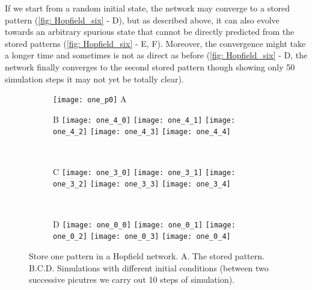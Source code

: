 If we start from a random initial state, the network may converge to
a stored pattern (\autoref{fig: Hopfield_six} - \textsf{D}), but as
described above, it can also evolve towards an arbitrary spurious state
that cannot be directly predicted from the stored patterns
(\autoref{fig: Hopfield_six} - \textsf{E, F}). Moreover, the convergence
might take a longer time and sometimes is not as direct as before 
(\autoref{fig: Hopfield_six} - \textsf{D}, the network finally converges
to the second stored pattern though showing only 50 simulation steps it may 
not yet be totally clear).

\newpage
\null
\vfill
\begin{figure}[H]
  \centering
  \begin{subfigure}{0.28\textwidth}
    \centering
    \texttt{[image: one\_p0]}
    \textsf{A}
  \end{subfigure}
  \hspace{0.7em}
  \begin{minipage}{0.62\textwidth}
    \begin{subfigure}{\textwidth}
      \textsf{B}
      \centering
      \texttt{[image: one\_4\_0]}
      \texttt{[image: one\_4\_1]}
      \texttt{[image: one\_4\_2]}
      \texttt{[image: one\_4\_3]}
      \texttt{[image: one\_4\_4]}
    \end{subfigure}\\[0.6em]
    \begin{subfigure}{\textwidth}
      \textsf{C}
      \centering
      \texttt{[image: one\_3\_0]}
      \texttt{[image: one\_3\_1]}
      \texttt{[image: one\_3\_2]}
      \texttt{[image: one\_3\_3]}
      \texttt{[image: one\_3\_4]}
    \end{subfigure}\\[0.6em]
    \begin{subfigure}{\textwidth}
      \textsf{D}
      \centering
      \texttt{[image: one\_0\_0]}
      \texttt{[image: one\_0\_1]}
      \texttt{[image: one\_0\_2]}
      \texttt{[image: one\_0\_3]}
      \texttt{[image: one\_0\_4]}
    \end{subfigure}
  \end{minipage}
  \vspace{1.2em}
  \caption{Store one pattern in a Hopfield network.
           \textsf{A.} The stored pattern.
           \textsf{B.C.D.} Simulations with different initial conditions
           (between two successive picutres we carry out 10 steps of
           simulation).}
  \label{fig: Hopfield_one}
\end{figure}

